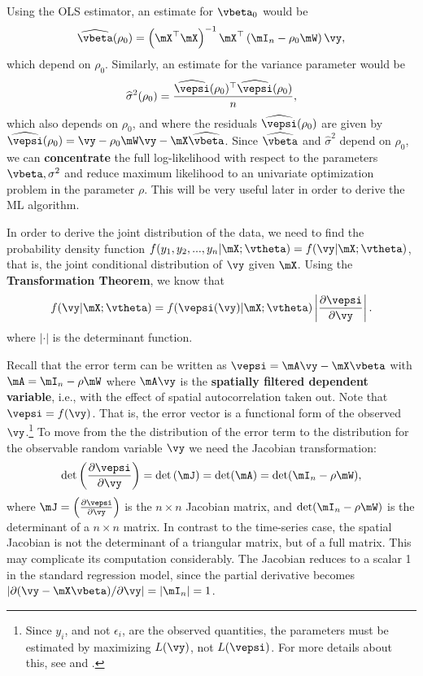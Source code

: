 Using the OLS estimator, an estimate for $\vbeta_0$ would be
\begin{equation*}
\widehat{\vbeta}(\rho_0) = \left(\mX^\top \mX\right)^{-1}\mX^\top\left(\mI_n - \rho_0\mW\right)\vy,
\end{equation*}
%
which depend on $\rho_0$. Similarly, an estimate for the variance parameter would be
\begin{equation*}
\widehat{\sigma}^2(\rho_0) = \frac{\widehat{\vepsi}(\rho_0)^\top\widehat{\vepsi}(\rho_0)}{n},
\end{equation*}
%
which also depends on $\rho_0$, and where the residuals $\widehat{\vepsi}(\rho_0)$ are given by $\widehat{\vepsi}(\rho_0)=\vy - \rho_0\mW\vy - \mX\widehat{\vbeta}$. Since $\widehat{\vbeta}$ and $\widehat{\sigma}^2$ depend on $\rho_0$, we can \textbf{concentrate} the full log-likelihood with respect to the parameters $\vbeta, \sigma^2$ and reduce maximum likelihood to an univariate optimization problem in the parameter $\rho$. This will be very useful later in order to derive the ML algorithm.

In order to derive the joint distribution of the data, we need to find the probability density function $f(y_1, y_2,...,y_n| \mX; \vtheta) = f(\vy|\mX;\vtheta)$, that is, the joint conditional distribution of $\vy$ given $\mX$. Using the \textbf{Transformation Theorem}, we know that
\begin{equation*}
  f(\vy | \mX; \vtheta) = f(\vepsi(\vy)| \mX; \vtheta) \left|\frac{\partial \vepsi}{\partial \vy}\right|.
\end{equation*}
%
where $\left|\cdot\right|$ is the determinant function. 

Recall that the error term can be written as $\vepsi = \mA\vy - \mX\vbeta$ with $\mA=\mI_n - \rho\mW$ where $\mA\vy$ is the \textbf{spatially filtered dependent variable}, i.e., with the effect of spatial autocorrelation taken out. Note that $\vepsi = f(\vy)$. That is, the error vector is a functional form of the observed $\vy$.\footnote{Since $y_i$, and not $\epsilon_i$, are the observed quantities, the parameters must be estimated by maximizing $L(\vy)$, not $L(\vepsi)$. For more details about this, see \cite{mead1967mathematical} and \cite{doreian1981estimating}.} To move from the the distribution of the error term to the distribution for the observable random variable $\vy$ we need the Jacobian transformation:
\begin{equation*}
\det\left(\frac{\partial \vepsi}{\partial \vy}\right)= \det\left(\mJ\right)=\det(\mA)=\det(\mI_n - \rho\mW),
\end{equation*}
%
where $\mJ = \left(\frac{\partial \vepsi}{\partial \vy}\right)$ is the $n\times n$ Jacobian matrix, and $\det(\mI_n - \rho\mW)$ is the determinant of a $ n \times n$ matrix. In contrast to the time-series case, the spatial Jacobian is not the determinant of a triangular matrix, but of a full matrix. This may complicate its computation considerably. The Jacobian reduces to a scalar 1 in the standard regression model, since the partial derivative becomes $\left|\partial (\vy - \mX\vbeta)/ \partial \vy\right| = \left|\mI_n\right| = 1$. 

